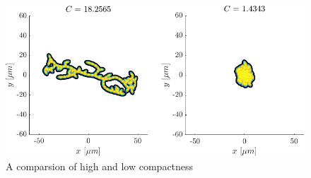 \begin{figure}[h]
    \centering
    \includegraphics[width=\textwidth]{chapter1/figures/compareCompactness.pdf}
    \caption{A comparsion of high and low compactness}
    \label{fig:compatness_comparison}
\end{figure}
